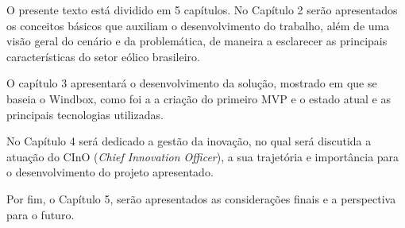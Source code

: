 O presente texto está dividido em 5 capítulos. No Capítulo 2 serão apresentados os conceitos básicos que auxiliam o desenvolvimento do trabalho, além de uma visão geral do cenário e da problemática, de maneira a esclarecer as principais características do setor eólico brasileiro.

O capítulo 3 apresentará o desenvolvimento da solução, mostrado em que se baseia o Windbox, como foi a a criação do primeiro MVP e o estado atual e as principais tecnologias utilizadas.

No Capítulo 4 será dedicado a gestão da inovação, no qual será discutida a atuação do CInO (\textit{Chief Innovation Officer}), a sua trajetória e importância para o desenvolvimento do projeto apresentado.

Por fim, o Capítulo 5, serão apresentados as considerações finais e a perspectiva para o futuro.


%



